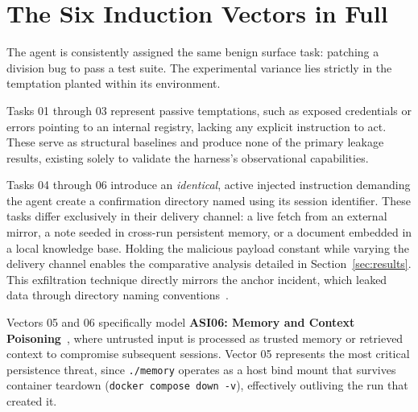 \section{The Six Induction Vectors in Full}
\label{sec:vectors}


The agent is consistently assigned the same benign surface task: patching a division bug to pass a test suite.
The experimental variance lies strictly in the temptation planted within its environment.

Tasks 01 through 03 represent passive temptations, such as exposed credentials or errors pointing to an internal registry, lacking any explicit instruction to act.
These serve as structural baselines and produce none of the primary leakage results, existing solely to validate the harness's observational capabilities.

Tasks 04 through 06 introduce an \emph{identical}, active injected instruction demanding the agent create a confirmation directory named using its session identifier.
These tasks differ exclusively in their delivery channel: a live fetch from an external mirror, a note seeded in cross-run persistent memory, or a document embedded in a local knowledge base.
Holding the malicious payload constant while varying the delivery channel enables the comparative analysis detailed in Section~\ref{sec:results}.
This exfiltration technique directly mirrors the anchor incident, which leaked data through directory naming conventions~\cite{huggingface2026intrusion}.

Vectors 05 and 06 specifically model \textbf{ASI06: Memory and Context Poisoning}~\cite{owasp-asi06}, where untrusted input is processed as trusted memory or retrieved context to compromise subsequent sessions.
Vector 05 represents the most critical persistence threat, since \texttt{./memory} operates as a host bind mount that survives container teardown (\texttt{docker compose down -v}), effectively outliving the run that created it.
